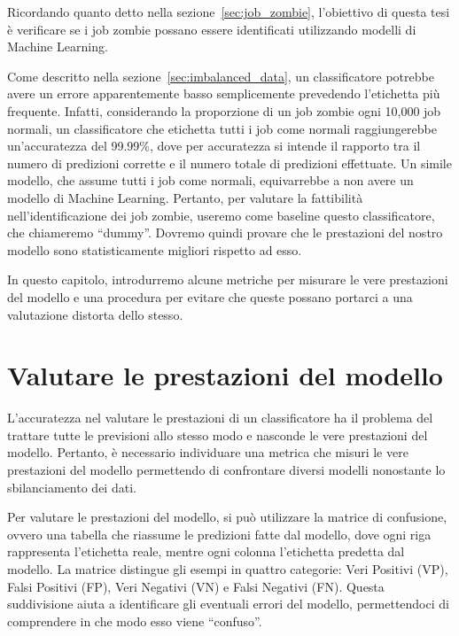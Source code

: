\label{chap:applicazione}

Ricordando quanto detto nella sezione~\ref{sec:job_zombie}, l'obiettivo di
questa tesi è verificare se i job zombie possano essere identificati
utilizzando modelli di Machine Learning.

Come descritto nella sezione~\ref{sec:imbalanced_data}, un classificatore
potrebbe avere un errore apparentemente basso semplicemente prevedendo
l'etichetta più frequente. Infatti, considerando la proporzione di un job
zombie ogni 10,000 job normali, un classificatore che etichetta tutti i job
come normali raggiungerebbe un'accuratezza del 99.99\%, dove per accuratezza
si intende il rapporto tra il numero di predizioni corrette e il numero totale
di predizioni effettuate. Un simile modello, che assume tutti i job come
normali, equivarrebbe a non avere un modello di Machine Learning. Pertanto,
per valutare la fattibilità nell'identificazione dei job zombie, useremo come
baseline questo classificatore, che chiameremo ``dummy''. Dovremo quindi
provare che le prestazioni del nostro modello sono statisticamente migliori
rispetto ad esso.

In questo capitolo, introdurremo alcune metriche per misurare le vere
prestazioni del modello e una procedura per evitare che queste possano
portarci a una valutazione distorta dello stesso.

\section{Valutare le prestazioni del modello}

L'accuratezza nel valutare le prestazioni di un classificatore ha il problema
del trattare tutte le previsioni allo stesso modo e nasconde le vere
prestazioni del modello. Pertanto, è necessario individuare una metrica che
misuri le vere prestazioni del modello permettendo di confrontare diversi
modelli nonostante lo sbilanciamento dei dati.

Per valutare le prestazioni del modello, si può utilizzare la matrice di
confusione, ovvero una tabella che riassume le predizioni fatte dal modello,
dove ogni riga rappresenta l'etichetta reale, mentre ogni colonna l'etichetta
predetta dal modello. La matrice distingue gli esempi in quattro categorie:
Veri Positivi (VP), Falsi Positivi (FP), Veri Negativi (VN) e Falsi Negativi
(FN). Questa suddivisione aiuta a identificare gli eventuali errori del
modello, permettendoci di comprendere in che modo esso viene ``confuso''.

